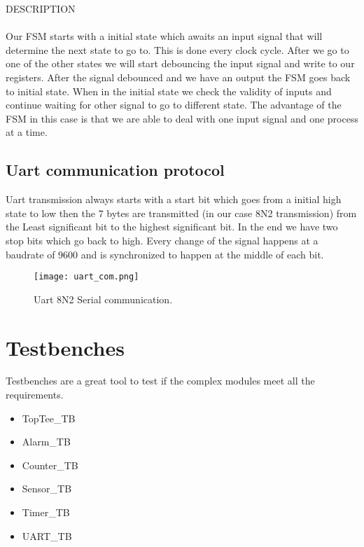 \documentclass{report}
\begin{document}
\LARGE
DESCRIPTION \\
\\
\Large
Our FSM starts with a initial state which awaits an input signal that will determine the next state to go to. This is done every clock cycle. After we go to one of the other states we will start debouncing the input signal and write to our registers. After the signal debounced and we have an output the FSM goes back to initial state. When in the initial state we check the validity of inputs and continue waiting for other signal to go to different state. The advantage of the FSM in this case is that we are able to deal with one input signal and one process at a time.
\vspace{1.5cm}
\newpage

\section{Uart communication protocol }
\Large
Uart transmission always starts with a start bit which goes from a initial high state to low then the 7 bytes are transmitted (in our case 8N2 transmission)  from the Least significant bit to the highest significant bit. In the end we have two stop bits which go back to high. Every change of the signal happens at a baudrate of 9600 and is synchronized to happen at the middle of each bit.
\vspace{1.5cm}

\begin{figure}[htbp]
	\centerline{\texttt{[image: uart\_com.png]}}
	\caption{Uart 8N2 Serial communication.}
	\label{fig}
\end{figure}

\newpage

\chapter{Testbenches}

\Large
\vspace{1cm}
Testbenches are a great tool to test if the complex modules meet all the requirements.
\vspace{1cm}
\begin{itemize}
	\item TopTee\_TB
	\item Alarm\_TB
	\item Counter\_TB
	\item Sensor\_TB
	\item Timer\_TB
	\item UART\_TB
\end{itemize}
\newpage
\end{document}

